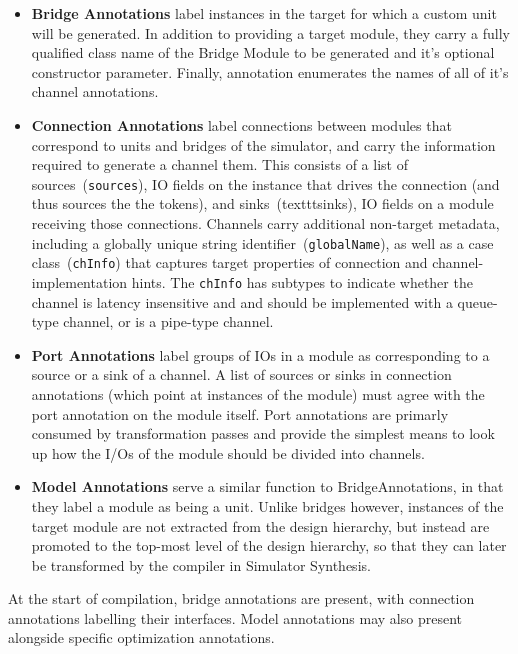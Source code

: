 \begin{itemize}
\item \textbf{Bridge Annotations} label instances in the target for which a custom unit will be generated.
    In addition to providing a target module, they carry a fully qualified class name
    of the Bridge Module to be generated and it's optional constructor parameter. Finally,
    annotation enumerates the names of all of it's channel annotations.

\item \textbf{Connection Annotations} label connections between modules that correspond to units and bridges of the simulator, and
    carry the information required to generate a channel them. This consists of
    a list of sources~(\texttt{sources}), IO fields on the instance that drives the connection
    (and thus sources the the tokens), and sinks~(texttt{sinks}), IO fields on a module
    receiving those connections. Channels carry additional non-target metadata,
    including a globally unique string identifier~(\texttt{globalName}), as well as a case class~(\texttt{chInfo}) that
    captures target properties of connection and channel-implementation hints.
    The \texttt{chInfo} has subtypes to indicate whether the channel is latency
    insensitive and and should be implemented with a queue-type channel, or is a pipe-type channel.

\item \textbf{Port Annotations} label groups of IOs in a module as corresponding to a source or a sink of a
    channel. A list of sources or sinks in connection annotations (which point
    at instances of the module) must agree with the port annotation on the
    module itself. Port annotations are primarly consumed by transformation passes and provide the simplest means
    to look up how the I/Os of the module should be divided into channels.

\item \textbf{Model Annotations} serve a similar function to BridgeAnnotations, in that they label a
    module as being a unit. Unlike bridges however, instances of the target module
    are not extracted from the design hierarchy, but instead are promoted to
    the top-most level of the design hierarchy, so that they can later be
    transformed by the compiler in Simulator Synthesis.
\end{itemize}

At the start of compilation, bridge annotations are present, with connection
annotations labelling their interfaces.  Model annotations may also present
alongside specific optimization annotations.

